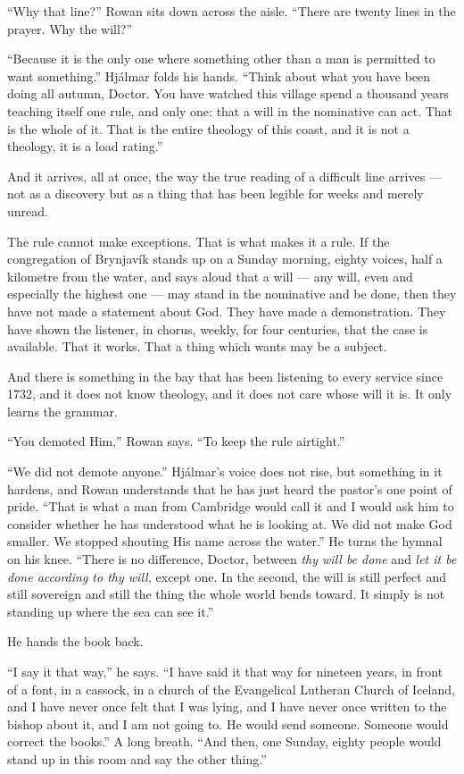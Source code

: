 \documentclass[11pt,oneside]{book}
\begin{document}
``Why that line?'' Rowan sits down across the aisle. ``There are twenty
lines in the prayer. Why the will?''

``Because it is the only one where something other than a man is
permitted to want something.'' Hjálmar folds his hands. ``Think about
what you have been doing all autumn, Doctor. You have watched this
village spend a thousand years teaching itself one rule, and only one:
that a will in the nominative can act. That is the whole of it. That is
the entire theology of this coast, and it is not a theology, it is a
load rating.''

And it arrives, all at once, the way the true reading of a difficult
line arrives --- not as a discovery but as a thing that has been legible
for weeks and merely unread.

The rule cannot make exceptions. That is what makes it a rule. If the
congregation of Brynjavík stands up on a Sunday morning, eighty voices,
half a kilometre from the water, and says aloud that a will --- any
will, even and especially the highest one --- may stand in the
nominative and be done, then they have not made a statement about God.
They have made a demonstration. They have shown the listener, in chorus,
weekly, for four centuries, that the case is available. That it works.
That a thing which wants may be a subject.

And there is something in the bay that has been listening to every
service since 1732, and it does not know theology, and it does not care
whose will it is. It only learns the grammar.

``You demoted Him,'' Rowan says. ``To keep the rule airtight.''

``We did not demote anyone.'' Hjálmar's voice does not rise, but
something in it hardens, and Rowan understands that he has just heard
the pastor's one point of pride. ``That is what a man from Cambridge
would call it and I would ask him to consider whether he has understood
what he is looking at. We did not make God smaller. We stopped shouting
His name across the water.'' He turns the hymnal on his knee. ``There is
no difference, Doctor, between \emph{thy will be done} and \emph{let it
be done according to thy will,} except one. In the second, the will is
still perfect and still sovereign and still the thing the whole world
bends toward. It simply is not standing up where the sea can see it.''

He hands the book back.

``I say it that way,'' he says. ``I have said it that way for nineteen
years, in front of a font, in a cassock, in a church of the Evangelical
Lutheran Church of Iceland, and I have never once felt that I was lying,
and I have never once written to the bishop about it, and I am not going
to. He would send someone. Someone would correct the books.'' A long
breath. ``And then, one Sunday, eighty people would stand up in this
room and say the other thing.''
\end{document}
